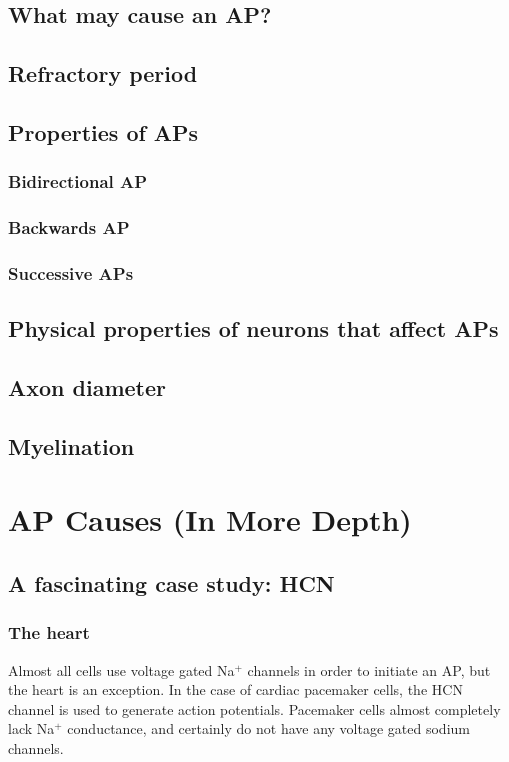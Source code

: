 \documentclass[12pt]{amsart}
\begin{document}
\subsection{What may cause an AP?}
\subsection{Refractory period}
\subsection{Properties of APs}
\subsubsection{Bidirectional AP}
\subsubsection{Backwards AP}
\subsubsection{Successive APs}
\subsection{Physical properties of neurons that affect APs}
\subsection{Axon diameter}
\subsection{Myelination}


\section{AP Causes (In More Depth)}
\subsection{A fascinating case study: HCN}
\subsubsection{The heart} Almost all cells use voltage gated Na$^+$ channels in order to initiate an AP, but the heart is an exception. In the case of cardiac pacemaker cells, the HCN channel is used to generate action potentials. Pacemaker cells almost completely lack Na$^+$ conductance, and certainly do not have any voltage gated sodium channels. 
\end{document}
